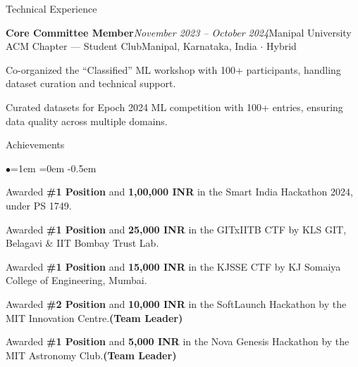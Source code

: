 \documentclass{resume} %
\begin{document}
\begin{rSection}{Technical Experience}
\begin{rSubsection}{\bf Core Committee Member}{\em November 2023 -- October 2024}{Manipal University ACM Chapter --- Student Club}{Manipal, Karnataka, India $\cdot$ Hybrid}
\item Co-organized the ``Classified'' ML workshop with 100+ participants, handling dataset curation and technical support.
\item Curated datasets for Epoch 2024 ML competition with 100+ entries, ensuring data quality across multiple domains.
\end{rSubsection}

\end{rSection}

\begin{rSection}{Achievements}
\begin{list}{$\bullet$}{\leftmargin=1em \itemindent=0em}
\itemsep -0.5em
\item Awarded \textbf{\#1 Position} and \textbf{1,00,000 INR} in the Smart India Hackathon 2024, under PS 1749.
\item Awarded \textbf{\#1 Position} and \textbf{25,000 INR} in the GITxIITB CTF by KLS GIT, Belagavi \& IIT Bombay Trust Lab.
\item Awarded \textbf{\#1 Position} and \textbf{15,000 INR} in the KJSSE CTF by KJ Somaiya College of Engineering, Mumbai.
\item Awarded \textbf{\#2 Position} and \textbf{10,000 INR} in the SoftLaunch Hackathon by the MIT Innovation Centre.\hfill\textbf{(Team Leader)}
\item Awarded \textbf{\#1 Position} and \textbf{5,000 INR} in the Nova Genesis Hackathon by the MIT Astronomy Club.\hfill\textbf{(Team Leader)}
\end{list}
\end{rSection}
\end{document}
